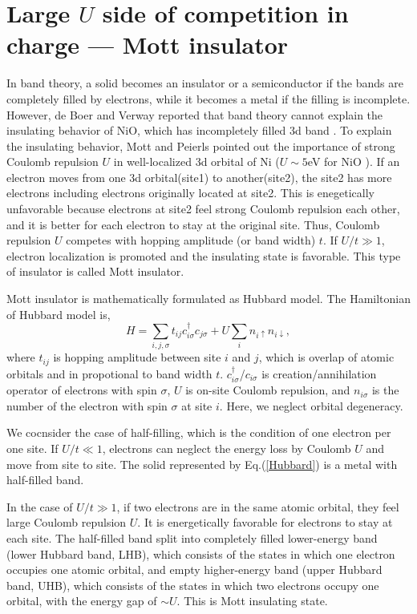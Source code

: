 \section{Large $U$ side of competition in charge --- Mott insulator}
\label{Mott_insulator}
In band theory, a solid becomes an insulator or a semiconductor if the bands are completely filled by electrons, while it becomes a metal if the filling is incomplete.
However, de Boer and Verway reported that band theory cannot explain the insulating behavior of NiO, which has incompletely filled 3d band \cite{}.
To explain the insulating behavior, Mott and Peierls pointed out the importance of strong Coulomb repulsion $U$ in well-localized 3d orbital of Ni \cite{} ($U \sim 5$eV for NiO \cite{bengone2000implementation}).
If an electron moves from one 3d orbital(site1) to another(site2), the site2 has more electrons including electrons originally located at site2.
This is enegetically unfavorable because electrons at site2 feel strong Coulomb repulsion each other, and it is better for each electron to stay at the original site.
Thus, Coulomb repulsion $U$ competes with hopping amplitude (or band width) $t$.
If $U/t \gg 1$, electron localization is promoted and the insulating state is favorable.
This type of insulator is called Mott insulator.

Mott insulator is mathematically formulated as Hubbard model.
The Hamiltonian of Hubbard model is,
\begin{equation}
H = \sum_{i,j,\sigma}t_{ij}c^{\dag}_{i\sigma}c_{j\sigma} + U\sum_i n_{i\uparrow}n_{i\downarrow},
\label{Hubbard}
\end{equation}
where $t_{ij}$ is hopping amplitude between site $i$ and $j$, which is overlap of atomic orbitals and in propotional to band width $t$.
$c^{\dag}_{i\sigma}$/$c_{i\sigma}$ is creation/annihilation
operator of electrons with spin $\sigma$,
$U$ is on-site Coulomb repulsion, and $n_{i\sigma}$ is the number
of the electron with spin $\sigma$ at site $i$.
Here, we neglect orbital degeneracy.

We cocnsider the case of half-filling, which is the condition of one electron per one site.
If $U/t \ll 1$, electrons can neglect the energy loss by Coulomb $U$ and move from site to site.
The solid represented by Eq.(\ref{Hubbard}) is a metal with half-filled band.

In the case of $U/t \gg 1$, if two electrons are in the same atomic orbital, they feel large Coulomb repulsion $U$.
It is energetically favorable for electrons to stay at each site.
The half-filled band split into completely filled lower-energy band (lower Hubbard band, LHB), which consists of the states in which one electron occupies one atomic orbital, and empty higher-energy band (upper Hubbard band, UHB), which consists of the states in which two electrons occupy one orbital, with the energy gap of $\sim U$.
This is Mott insulating state.

